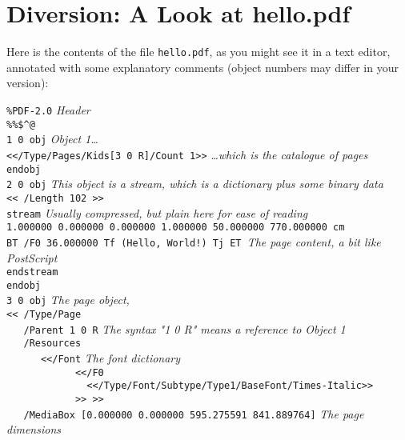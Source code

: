 \documentclass[a4paper]{memoir}
\begin{document}
\section*{Diversion: A Look at hello.pdf}
Here is the contents of the file \texttt{hello.pdf}, as you might see it in a text editor, annotated with some explanatory comments (object numbers may differ in your version):
\begin{framed}
\noindent\small\verb!%PDF-2.0! \textit{Header}\\
\noindent\small\verb!%%$^@!\\
\noindent\small\verb!1 0 obj! \textit{Object 1\ldots}\\
\noindent\small\verb!<</Type/Pages/Kids[3 0 R]/Count 1>>! \textit{\ldots which is the catalogue of pages}\\
\noindent\small\verb!endobj!\\
\noindent\small\verb!2 0 obj! \textit{This object is a stream, which is a dictionary plus some binary data}\\
\noindent\small\verb!<< /Length 102 >>!\\
\noindent\small\verb!stream! \textit{Usually compressed, but plain here for ease of reading}\\
\noindent\small\verb!1.000000 0.000000 0.000000 1.000000 50.000000 770.000000 cm!\\
\noindent\small\verb$BT /F0 36.000000 Tf (Hello, World!) Tj ET $\textit{The page content, a bit like PostScript}\\
\noindent\small\verb!endstream!\\
\noindent\small\verb!endobj!\\
\noindent\small\verb!3 0 obj! \textit{The page object, }\\
\noindent\small\verb!<< /Type/Page!\\
\noindent\small\verb!   /Parent 1 0 R! \textit{The syntax "1 0 R" means a reference to Object 1}\\ 
\noindent\small\verb!   /Resources!\\
\noindent\small\verb!      <</Font! \textit{The font dictionary}\\
\noindent\small\verb!            <</F0!\\
\noindent\small\verb!              <</Type/Font/Subtype/Type1/BaseFont/Times-Italic>>!\\
\noindent\small\verb!            >> >>!\\
\noindent\small\verb!   /MediaBox [0.000000 0.000000 595.275591 841.889764]! \textit{The page dimensions}\\

\end{framed}
\end{document}
